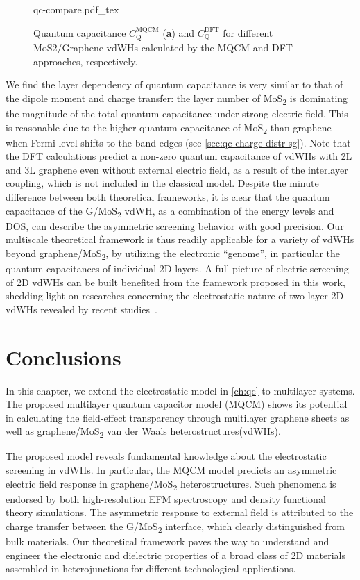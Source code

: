 \begin{figure}[!htbp]
  {qc-compare.pdf_tex}
  \caption{\label{fig:asym-qc} %
    Quantum capacitance $C_{\mathrm{Q}}^{\mathrm{MQCM}}$ (\textbf{a}) and $C_{\mathrm{Q}}^{\mathrm{DFT}}$ for different MoS2/Graphene
    vdWHs calculated by the MQCM and DFT approaches, respectively.
  }
\end{figure}
%
We find the layer dependency of quantum capacitance is very
similar to that of the dipole moment and charge transfer: the layer
number of MoS\textsubscript{2} is dominating the magnitude of the
total quantum capacitance under strong electric field. This is
reasonable due to the higher quantum capacitance of
MoS\textsubscript{2} than graphene when Fermi level shifts to the band
edges (see \autoref{sec:qc-charge-distr-sg}).
%
Note that the DFT calculations predict a non-zero quantum capacitance
of vdWHs with 2L and 3L graphene even without external electric field,
as a result of the interlayer coupling, which is not included in the
classical model. Despite the minute difference between both
theoretical frameworks, it is clear that the quantum capacitance of
the G/MoS\textsubscript{2} vdWH, as a combination of the energy levels
and DOS, can describe the asymmetric screening behavior with good
precision. Our multiscale theoretical framework is thus readily
applicable for a variety of vdWHs beyond
graphene/MoS\textsubscript{2}, by utilizing the electronic “genome”,
in particular the quantum capacitances of individual 2D layers. A full
picture of electric screening of 2D vdWHs can be built benefited from
the framework proposed in this work, shedding light on researches
concerning the electrostatic nature of two-layer 2D vdWHs revealed by
recent
studies~\cite{Chu_2017_eh_tunneling,Lee_2014_pn_vdw_het,Furchi_2014_PV_vdwH}.

\section{Conclusions}
\label{sec:asym-conclusions}


In this chapter, we extend the electrostatic model in \autoref{ch:qc}
to multilayer systems. The proposed multilayer quantum capacitor model
(MQCM) shows its potential in calculating the field-effect
transparency through multilayer graphene sheets as well as
graphene/MoS\textsubscript{2} van der Waals heterostructures(vdWHs). 

The proposed model reveals fundamental knowledge about the
electrostatic screening in vdWHs.
In particular, the MQCM model predicts an
asymmetric electric field response in
graphene/MoS\textsubscript{2} heterostructures. Such phenomena is endorsed by
both high-resolution EFM spectroscopy
and density functional theory simulations.
%
The asymmetric response to external field is attributed to the charge transfer between the G/MoS\textsubscript{2} interface, which clearly distinguished from bulk materials.
%
Our theoretical framework paves the way to
understand and engineer the electronic and dielectric properties of a
broad class of 2D materials assembled in heterojunctions for different
technological applications.

